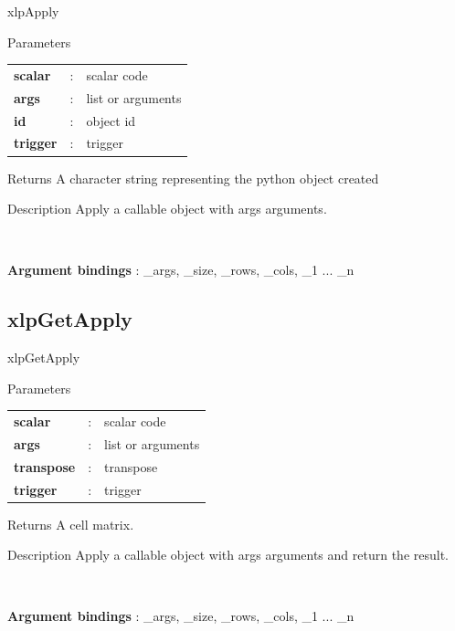 \begin{xlpfunctitle}{xlpApply}

\begin{xlpfunc}{Parameters}
\begin{tabular}{p{3.5cm}cl}
\textbf{scalar}& : & scalar code \\
\textbf{args}& : & list or arguments \\
\textbf{id}& : & object id   \\
\textbf{trigger}& : & trigger \\
\end{tabular}

\vspace{2mm}

\end{xlpfunc}


\begin{xlpfunc}{Returns}
A character string representing the python object created
\end{xlpfunc}

\begin{xlpfunc}{Description}
Apply a callable object with args arguments.

\

\textbf{Argument bindings} : \_args, \_size, \_rows, \_cols, \_1 ... \_n

\end{xlpfunc}
\end{xlpfunctitle}


\subsection{xlpGetApply}

\begin{xlpfunctitle}{xlpGetApply}

\begin{xlpfunc}{Parameters}
\begin{tabular}{p{3.5cm}cl}
\textbf{scalar}& : & scalar code \\
\textbf{args}& : & list or arguments \\
\textbf{transpose}& : & transpose \\
\textbf{trigger}& : & trigger \\
\end{tabular}

\vspace{2mm}

\end{xlpfunc}


\begin{xlpfunc}{Returns}
A cell matrix.
\end{xlpfunc}

\begin{xlpfunc}{Description}
Apply a callable object with args arguments and return the result.

\

\textbf{Argument bindings} : \_args, \_size, \_rows, \_cols, \_1 ... \_n

\end{xlpfunc}
\end{xlpfunctitle}

